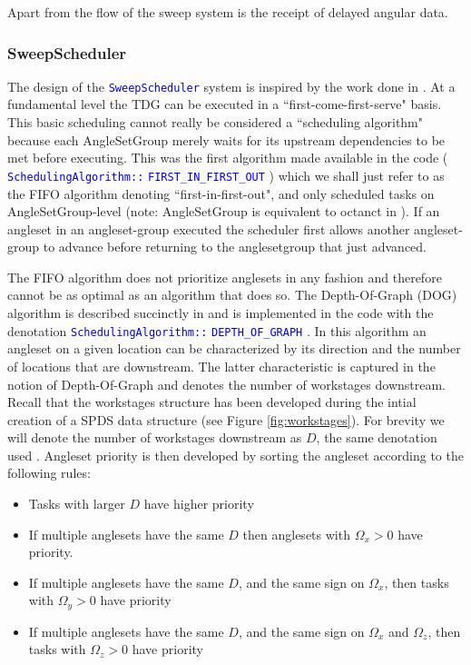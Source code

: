 \documentclass[11pt,letterpaper,titlepage]{article}
\newcommand{\xmltag}[1]{\textcolor{blue}{ \texttt{#1}} }
\numberwithin{equation}{section}
\begin{document}
Apart from the flow of the sweep system is the receipt of delayed angular data.


\newpage
\subsubsection{SweepScheduler}
The design of the \xmltag{SweepScheduler} system is inspired by the work done in \cite{ProvablyOptimalSweep}. At a fundamental level the TDG can be executed in a ``first-come-first-serve" basis. This basic scheduling cannot really be considered a ``scheduling algorithm" because each AngleSetGroup merely waits for its upstream dependencies to be met before executing. This was the first algorithm made available in the code (\xmltag{SchedulingAlgorithm::}\xmltag{FIRST\_IN\_FIRST\_OUT}) which we shall just refer to as the FIFO algorithm denoting ``first-in-first-out", and only scheduled tasks on AngleSetGroup-level (note: AngleSetGroup is equivalent to octanct in \cite{ProvablyOptimalSweep}). If an angleset in an angleset-group executed the scheduler first allows another angleset-group to advance before returning to the anglesetgroup that just advanced.

The FIFO algorithm does not prioritize anglesets in any fashion and therefore cannot be as optimal as an algorithm that does so.
\newline
\newline
The Depth-Of-Graph (DOG) algorithm is described succinctly in \cite{ProvablyOptimalSweep} and is implemented in the code with the denotation \xmltag{SchedulingAlgorithm::}\xmltag{DEPTH\_OF\_GRAPH}. In this algorithm an angleset on a given location can be characterized by its direction and the number of locations that are downstream. The latter characteristic is captured in the notion of Depth-Of-Graph and denotes the number of workstages downstream. Recall that the workstages structure has been developed during the intial creation of a SPDS data structure (see Figure \ref{fig:workstages}). For brevity we will denote the number of workstages downstream as $D$, the same denotation used \cite{ProvablyOptimalSweep}. Angleset priority is then developed by sorting the angleset according to the following rules:
\begin{itemize}
\item Tasks with larger $D$ have higher priority
\item If multiple anglesets have the same $D$ then anglesets with $\Omega_x>0$ have priority.
\item If multiple anglesets have the same $D$, and the same sign on $\Omega_x$, then tasks with $\Omega_y>0$ have priority
\item If multiple anglesets have the same $D$, and the same sign on $\Omega_x$ and $\Omega_z$, then tasks with $\Omega_z>0$ have priority
\end{itemize}
\end{document}
